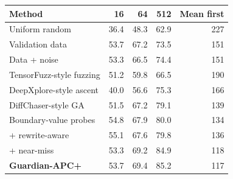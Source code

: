 \begin{tabular}{@{}lrrrr@{}}
\toprule
Method & 16 & 64 & 512 & Mean first \\
\midrule
Uniform random & 36.4 & 48.3 & 62.9 & 227 \\
Validation data & 53.7 & 67.2 & 73.5 & 151 \\
Data + noise & 53.3 & 66.5 & 74.4 & 151 \\
TensorFuzz-style fuzzing & 51.2 & 59.8 & 66.5 & 190 \\
DeepXplore-style ascent & 40.0 & 56.6 & 75.3 & 166 \\
DiffChaser-style GA & 51.5 & 67.2 & 79.1 & 139 \\
Boundary-value probes & 54.8 & 67.9 & 80.0 & 134 \\
\quad + rewrite-aware & 55.1 & 67.6 & 79.8 & 136 \\
\quad + near-miss & 53.3 & 69.2 & 84.9 & 118 \\
\textbf{Guardian-APC+} & 53.7 & 69.4 & 85.2 & 117 \\
\bottomrule
\end{tabular}
